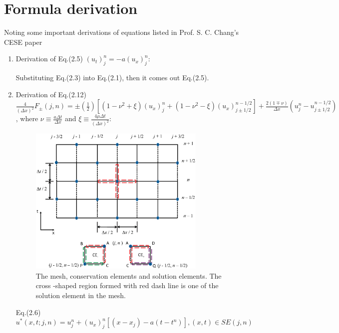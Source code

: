 \documentclass[a4paper,12pt,dvips]{article}
\begin{document}
\section{Formula derivation}
 \label{sec:formula_derivation}
Noting some important derivations of equations listed in Prof. S. C. Chang's
CESE paper~\cite{CESE_Shin_Chung_Chang_1995}
 \begin{enumerate}
  \item Derivation of Eq.(2.5) $(u_t)^n_j = -a(u_x)^n_j$:

    \hspace{4mm}Substituting Eq.(2.3) into Eq.(2.1), then it comes out Eq.(2.5).

  \item Derivation of Eq.(2.12) \newline
    $\frac{4}{(\Delta x)^{2}}F_{\pm}(j, n)=
    \pm(\frac{1}{2})[(1-\nu^{2}+\xi)(u_{x})^{n}_{j}
    +(1-\nu^{2}-\xi)(u_{x})^{n-1/2}_{j\pm1/2}]
    +\frac{2(1\mp\nu)}{\Delta x}(u^{n}_{j}-u^{n-1/2}_{j\pm1/2})$,
    where $\nu\equiv\frac{a\Delta t}{\Delta x}$
    and $\xi\equiv\frac{4\mu\Delta t}{(\Delta x)^{2}}$:
    \begin{figure}[hbtp]
     \centering
      \includegraphics[width=0.8\textwidth]{mesh_and_ce_se_v1.eps}
      \caption{The mesh, conservation elements and solution elements. The cross
               -shaped region formed with red dash line is one of the solution
               element in the mesh.}
     \label{fig:mesh_and_ce_se_v1}
    \end{figure}

    \hspace{4mm}Eq.(2.6) $u^{*}(x,t;j,n)=u^{n}_{j}+(u_{x})^{n}_{j}[(x-x_{j})
                         -a(t-t^{n})], (x,t)\in SE(j,n)$


\end{enumerate}
\end{document}
